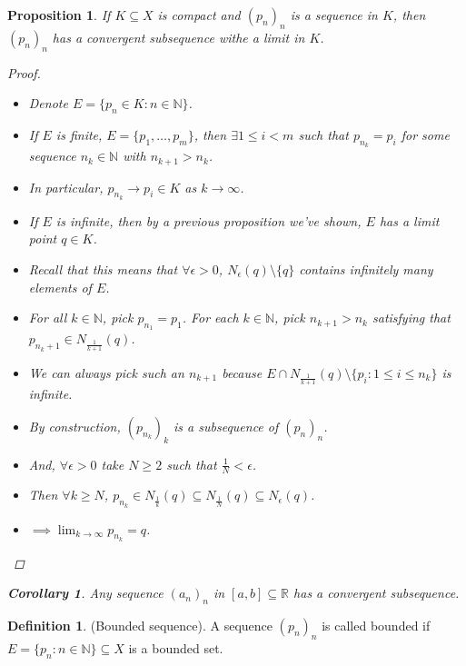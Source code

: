 \documentclass[10pt]{article}
\newcommand{\N}{\mathbb{N}}
\newcommand{\R}{\mathbb{R}}
\newtheorem{corollary}[theorem]{Corollary}
\newtheorem{proposition}[theorem]{Proposition}
\theoremstyle{definition}
\newtheorem{definition}[theorem]{Definition}
\theoremstyle{remark}
\begin{document}
\begin{proposition}
    If $K \subseteq X$ is compact and $(p_n)_n$ is a sequence in $K$, then $(p_n)_n$ has a convergent subsequence withe a limit in $K$.
    \begin{proof}
        \hfill
        \begin{itemize}
            \item Denote $E = \{p_n \in K : n \in \N\}$.
            \item If $E$ is finite, $E = \{p_1, \ldots, p_m\}$, then $\exists 1 \leq i < m$ such that $p_{n_k} = p_i$ for some sequence $n_k \in \N$ with $n_{k+1} > n_k$.
            \item In particular, $p_{n_k} \to p_i \in K$ as $k \to \infty$.
            \item If $E$ is infinite, then by a previous proposition we've shown, $E$ has a limit point $q \in K$.
            \item Recall that this means that $\forall \epsilon> 0$, $N_\epsilon(q) \setminus \{q\}$ contains infinitely many elements of $E$.
            \item For all $k \in \N$, pick $p_{n_1} = p_1$. For each $k \in \N$, pick $n_{k+1} > n_k$ satisfying that $p_{n_k + 1} \in N_{\frac{1}{k+1}}(q)$.
            \item We can always pick such an $n_{k+1}$ because $E \cap N_{\frac{1}{k+1}}(q) \setminus \{p_i : 1 \leq i \leq n_k\}$ is infinite.
            \item By construction, $(p_{n_k})_k$ is a subsequence of $(p_n)_n$.
            \item And, $\forall \epsilon> 0$ take $N \geq 2$ such that $\frac{1}{N} < \epsilon$.
            \item Then $\forall k \geq N$, $p_{n_k} \in N_{\frac{1}{k}}(q) \subseteq N_{\frac{1}{N}}(q) \subseteq N_\epsilon(q)$.
            \item $\implies \lim_{k \to \infty} p_{n_k} = q$.
        \end{itemize}
    \end{proof}
    \begin{corollary}
        Any sequence $(a_n)_n$ in $[a, b] \subseteq \R$ has a convergent subsequence.
    \end{corollary}
\end{proposition}

\begin{definition}
    (Bounded sequence).
    A sequence $(p_n)_n$ is called bounded if $E = \{p_n : n \in \N\} \subseteq X$ is a bounded set.
\end{definition}
\end{document}
